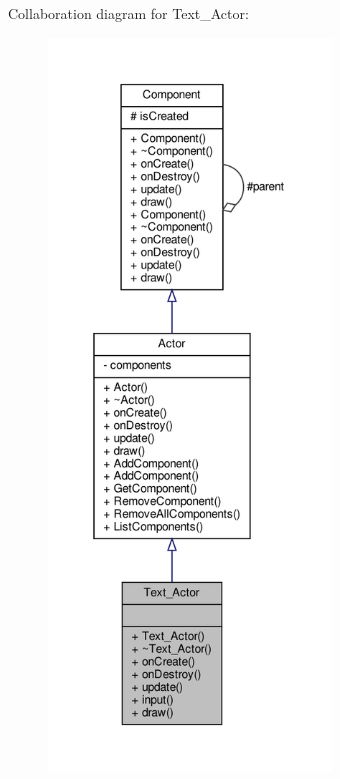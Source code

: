 Collaboration diagram for Text\+\_\+\+Actor\+:
\nopagebreak
\begin{figure}[H]
\begin{center}
\leavevmode
\includegraphics[height=550pt]{classText__Actor__coll__graph}
\end{center}
\end{figure}
